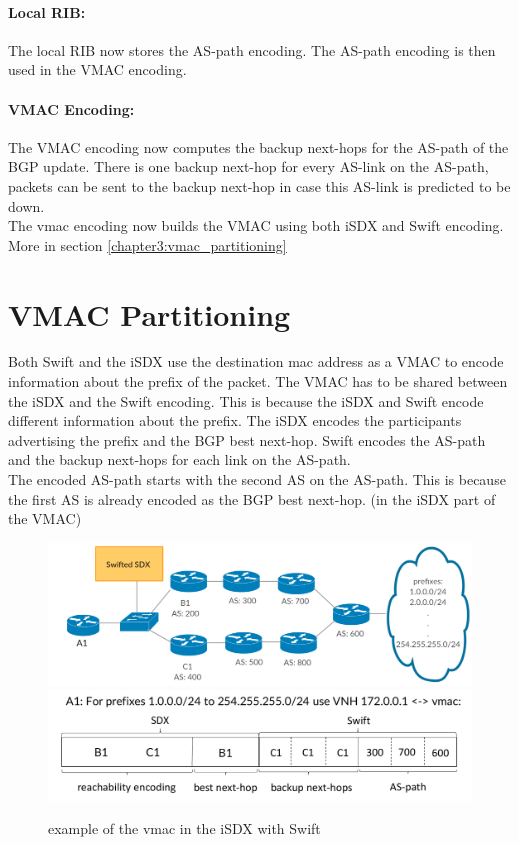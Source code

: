 \paragraph{\label{chapter3:Changes to the iSDX:local RIB}Local RIB:}
The local RIB now stores the AS-path encoding. The AS-path encoding is then used in the VMAC encoding. 

\paragraph{\label{chapter3:Changes to the iSDX:Vmac Encoding}VMAC Encoding:}
The VMAC encoding now computes the backup next-hops for the AS-path of the BGP update. There is one backup next-hop for every AS-link on the AS-path, packets can be sent to the backup next-hop in case this AS-link is predicted to be down. \\
The vmac encoding now builds the VMAC using both iSDX and Swift encoding. \\
More in section \ref{chapter3:vmac_partitioning} 

\section{\label{chapter3:vmac_partitioning}VMAC Partitioning}

Both Swift and the iSDX use the destination mac address as a VMAC to encode information about the prefix of the packet. The VMAC has to be shared between the iSDX and the Swift encoding. This is because the iSDX and Swift encode different information about the prefix. The iSDX encodes the participants advertising the prefix and the BGP best next-hop. Swift encodes the AS-path and the backup next-hops for each link on the AS-path. \\
The encoded AS-path starts with the second AS on the AS-path. This is because the first AS is already encoded as the BGP best next-hop. (in the iSDX part of the VMAC)
\begin{figure}[h]
\center
\includegraphics[scale = 0.24]{Figures/design_vmac_topology.pdf}
\includegraphics[scale = 0.35]{Figures/design_vmac_cropped.pdf}
\caption{example of the vmac in the iSDX with Swift}
\end{figure}

\newpage
